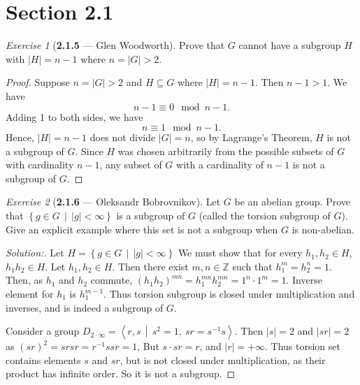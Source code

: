 \documentclass[12pt]{amsart}
\theoremstyle{remark}
\newtheorem*{exercise}{Exercise}%
\newcommand{\ZZ}{{\mathbb Z}}
\theoremstyle{mycomment}
\begin{document}
  

\section*{\textbf{Section 2.1}}


\begin{exercise}[\textbf{2.1.5} --- Glen Woodworth] Prove that $G$ cannot have a subgroup $H$ with $|H|=n-1$ where $n=|G|>2$.
  \begin{proof} Suppose $n=|G|>2$ and $H\subseteq G$ where $|H|=n-1$. Then $n-1>1$. We have \[n-1\equiv 0\mod n-1.\] Adding 1 to both sides, we have \[n\equiv 1\mod n-1.\] Hence, $|H|=n-1$ does not divide $|G|=n$, so by Lagrange's Theorem, $H$ is not a subgroup of $G$. Since $H$ was chosen arbitrarily from the possible subsets of $G$ with cardinality $n-1$, any subset of $G$ with a cardinality of $n-1$ is not a subgroup of $G$.
  \end{proof}
\end{exercise} 
\vspace{.15in}



\begin{exercise}[\textbf{2.1.6} --- Oleksandr Bobrovnikov]
  \def\abs#1{\left\lvert#1\right\lvert}
  \def\scpr#1{\left\langle #1\right\rangle }
  \def\midd{\,\middle\vert\, }
  Let $G$ be an abelian group. Prove that $\left\{ g\in G\,\middle\vert\,  \abs g <\infty \right\}$ is a subgroup of $G$ (called the torsion subgroup of $G$). Give an explicit example where this set is not a subgroup when $G$ is non-abelian.

  \begin{proof}[Solution:]
    Let $H=\left\{ g\in G\,\middle\vert\,  \abs g <\infty \right\}$ We must show that for every $h_1,h_2\in H$, $h_1h_2\in H$.
    Let $h_1,h_2\in H$. Then there exist $m,n\in\ZZ$ such that  $h_1^m=h_2^n=1$. Then, as $h_1$ and $h_2$ commute, $(h_1h_2)^{mn}=h_1^{mn}h_2^{mn}=1^n\cdot 1^m=1$.
    Inverse element for $h_1$ is $h_1^{m-1}$. Thus torsion subgroup is closed under multiplication and inverses, and is indeed a subgroup of $G$.

    Consider a group $D_{2\cdot\infty}=\scpr{r,s\midd s^2=1,~sr=s^{-1}s}$. Then $\abs s=2$ and $\abs{sr}=2$ as $(sr)^2=srsr=r^{-1}ssr=1$, But $s\cdot sr =r$, and $\abs r=+\infty$. Thus torsion set contains elements $s$ and $sr$, but is not closed under multiplication, as their product has infinite order. So it is not a subgroup.
  \end{proof}
\end{exercise}
\vspace{.15in}
\end{document}
